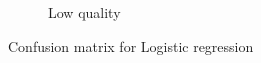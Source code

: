 \documentclass[twocolumn]{article}
\begin{document}
\begin{figure}[h]
\begin{subfigure}[b]{0.48\linewidth}
        \caption{Low quality}
\end{subfigure}%
\vspace{-2mm}
\caption{Confusion matrix for Logistic regression}
\label{fig:confusion_matrix_logreg}
\end{figure}
\end{document}
